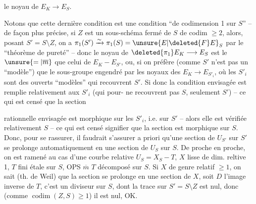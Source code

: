 le noyau de $E_K\longrightarrow E_S$.

Notons que cette dernière condition est une condition ``de codimension 1 sur $S$'' -- de façon plus précise, si $Z$ est un sous-schéma fermé de $S$ de codim $\geq 2$,  alors, posant $S'=S\setminus Z$, on a $\pi_1(S')\xrightarrow{\sim}\pi_1(S)=\unsure{E|\deleted{F}E}_S$ par le ``théorème de pureté'' -- donc le noyau de $\deleted{\pi_1}E_K\longrightarrow E_S$ est le $\unsure{=|\overline{m}}$ que celui de $E_K-E_{S'}$, ou, si on préfère (comme $S'$ n'est pas un ``modèle'') que le sous-groupe  engendré par les noyaux des $E_K\longrightarrow E_{S'_i}$, où les $S'_i$ sont des ouverts ``modèles'' qui recouvrent $S'$. Si donc la condition envisagée est remplie relativement aux $S'_i$ (qui pour- ne recouvrent pas $S$, seulement $S'$) -- ce qui est censé  que la section

rationnelle envisagée est morphique sur
les $S'_i$, i.e. sur $S'$ -- alors elle est
vérifiée relativement  $S$ -- ce qui
est censé signifier que la section est
morphique sur $S$. Donc, pour se
rassurer, il faudrait s'assurer a
priori qu'une section de $U_{S'}$ sur $S'$
se prolonge automatiquement en 
une section de $U_S$ sur $S$. De proche
en proche, on est ramené au cas
d'une courbe relative $U_S=X_S-T$,
$X$ lisse  de dim. reltive 1, $T$ fini étale
sur $S$,  OPS $\overline m$ $T$ décomposé sur $S$.
Si $X$ de genre relatif $\geq 1$, on sait
(th. de Weil) que la section se prolonge
en une section de $X$, soit $D$ l'image
inverse de $T$, c'est un diviseur sur $S$,
dont la trace sur $S'=S\setminus Z$ est nul, donc
(comme $\operatorname{codim}(Z,S)\geq 1$) il est nul, OK.

